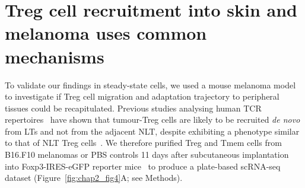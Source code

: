 \section{Treg cell recruitment into skin and melanoma uses common mechanisms}
\label{section2.5}
To validate our findings in steady-state cells, we used a mouse melanoma model to investigate if Treg cell migration and adaptation trajectory to peripheral tissues could be recapitulated. Previous studies analysing human TCR repertoires~\citep{Sherwood2013-jf,Plitas2016-rg} have shown that tumour-Treg cells are likely to be recruited \textit{de novo} from LTs and not from the adjacent NLT, despite exhibiting a phenotype similar to that of NLT Treg cells~\citep{Plitas2016-rg,De_Simone2016-yo}. We therefore purified Treg and Tmem cells from B16.F10 melanomas or PBS controls 11 days after subcutaneous implantation into Foxp3-IRES-eGFP reporter mice~\citep{Haribhai2007-tk} to produce a plate-based scRNA-seq dataset (Figure~\ref{fig:chap2_fig4}A; see Methods).

